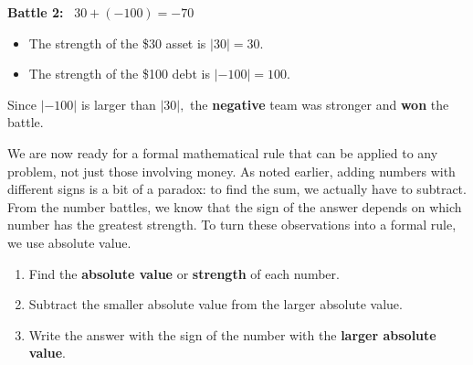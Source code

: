 \documentclass{ximera}[font=12pt]
\begin{document}
\textcolor{orange!80!black}{\textbf{Battle 2:}} \ $30 + (-100) = -70$
\begin{itemize}
    \item[] The strength of the \$30 asset is $|30| = 30$.
    \item[] The strength of the \$100 debt is $|-100| = 100$.
\end{itemize}

Since $|-100|$ is larger than $|30|,$ the \textbf{negative} team was stronger and \textbf{won} the battle.

We are now ready for a formal mathematical rule that can be applied to any problem, not just those involving money.  
As noted earlier, adding numbers with different signs is a bit of a paradox: to find the sum, 
we actually have to subtract.  From the number battles, we know that the sign of the answer depends on which number 
has the greatest strength.  To turn these observations into a formal rule, we use absolute value.


\begin{procedure}

\begin{enumerate} 
    \item Find the \textbf{absolute value} or \textbf{strength} of each number.

     \item Subtract the smaller absolute value from the larger absolute value.

     \item Write the answer with the sign of the number with the \textbf{larger absolute value}.
\end{enumerate}
\end{procedure}
\end{document}
